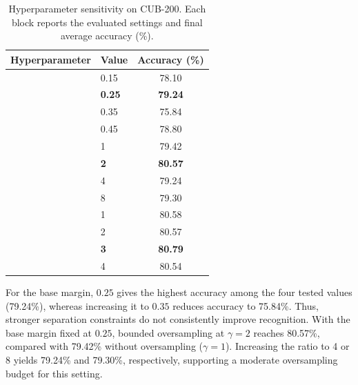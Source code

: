 \documentclass[journal]{IEEEtran}
\theoremstyle{plain}
\theoremstyle{definition}
\theoremstyle{remark}
\begin{document}
\begin{table}[!t]
\centering
\caption{Hyperparameter sensitivity on CUB-200. Each block reports the evaluated settings and final average accuracy (\%).}
\label{tab:hyperparameters}
\scriptsize
\setlength{\tabcolsep}{4pt}
\renewcommand{\arraystretch}{1.1} 
\begin{tabular}{llc}
\toprule
\textbf{Hyperparameter} & \textbf{Value} & \textbf{Accuracy (\%)} \\
\midrule
& 0.15 & 78.10 \\
& \textbf{0.25} & \textbf{79.24} \\
& 0.35 & 75.84 \\
& 0.45 & 78.80 \\
\midrule
& 1 & 79.42 \\
& \textbf{2} & \textbf{80.57} \\
& 4 & 79.24 \\
& 8 & 79.30 \\
\midrule
& 1 & 80.58 \\
& 2 & 80.57 \\
& \textbf{3} & \textbf{80.79} \\
& 4 & 80.54 \\
\bottomrule
\end{tabular}
\end{table}

For the base margin, $0.25$ gives the highest accuracy among the four tested values (79.24\%), whereas increasing it to $0.35$ reduces accuracy to 75.84\%. Thus, stronger separation constraints do not consistently improve recognition. With the base margin fixed at $0.25$, bounded oversampling at $\gamma=2$ reaches 80.57\%, compared with 79.42\% without oversampling ($\gamma=1$). Increasing the ratio to 4 or 8 yields 79.24\% and 79.30\%, respectively, supporting a moderate oversampling budget for this setting.
\end{document}
